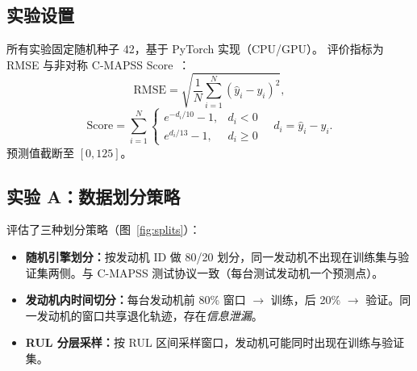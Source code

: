 \documentclass[UTF8,a4paper,10pt,twocolumn]{ctexart}
\begin{document}
\subsection{实验设置}

所有实验固定随机种子 42，基于 PyTorch 实现（CPU/GPU）。
评价指标为 RMSE 与非对称 C-MAPSS Score~\cite{saxena2008}：
\begin{equation}
  \mathrm{RMSE} = \sqrt{\frac{1}{N}\sum_{i=1}^{N}(\hat{y}_i - y_i)^2},
\end{equation}
\begin{equation}
  \mathrm{Score} = \sum_{i=1}^{N}
  \begin{cases}
    e^{-d_i/10} - 1, & d_i < 0 \\
    e^{d_i/13} - 1,  & d_i \geq 0
  \end{cases}
  \quad d_i = \hat{y}_i - y_i.
\end{equation}
预测值截断至 $[0, 125]$。

\subsection{实验 A：数据划分策略}

评估了三种划分策略（图~\ref{fig:splits}）：

\begin{itemize}
  \item \textbf{随机引擎划分：}按发动机 ID 做 80/20 划分，同一发动机不出现在训练集与验证集两侧。与 C-MAPSS 测试协议一致（每台测试发动机一个预测点）。
  \item \textbf{发动机内时间切分：}每台发动机前 80\% 窗口 $\rightarrow$ 训练，后 20\% $\rightarrow$ 验证。同一发动机的窗口共享退化轨迹，存在\emph{信息泄漏}。
  \item \textbf{RUL 分层采样：}按 RUL 区间采样窗口，发动机可能同时出现在训练与验证集。
\end{itemize}
\end{document}
